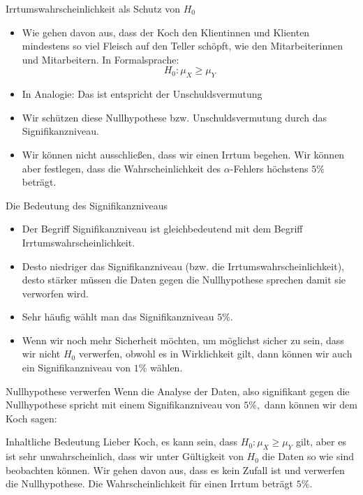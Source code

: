 \documentclass[usenames,dvipsnames,handout]{beamer}
\begin{document}
\begin{frame}{Irrtumswahrscheinlichkeit als Schutz von $H_{0}$}

\begin{itemize}
\item{Wie gehen davon aus, dass der Koch den Klientinnen und Klienten mindestens so viel Fleisch auf den Teller
schöpft, wie den Mitarbeiterinnen und Mitarbeitern. In Formalsprache: $$H_{0}: \mu_{X} \geq \mu_{Y}$$ }\pause
\item{In Analogie: Das ist entspricht der Unschuldsvermutung}\pause
\item{Wir schützen diese Nullhypothese bzw. Unschuldsvermutung durch das Signifikanzniveau.}\pause
\item{Wir können nicht ausschließen, dass wir einen Irrtum begehen. Wir können aber festlegen,
dass die Wahrscheinlichkeit des $\alpha$-Fehlers höchstens $5\%$ beträgt.}\pause
\end{itemize}
\end{frame}

\begin{frame}{Die Bedeutung des Signifikanzniveaus}
\begin{itemize}
\item{Der Begriff Signifikanzniveau ist gleichbedeutend mit dem Begriff Irrtumswahrscheinlichkeit.}\pause
\item{Desto niedriger das Signifikanzniveau (bzw. die Irrtumswahrscheinlichkeit), desto stärker müssen 
die Daten gegen die Nullhypothese sprechen damit sie verworfen wird.}\pause
\item{Sehr häufig wählt man das Signifikanzniveau $5\%.$}\pause
\item{Wenn wir noch mehr Sicherheit möchten, um möglichst sicher zu sein, dass wir nicht 
$H_{0}$ verwerfen, obwohl es in Wirklichkeit gilt, dann können wir auch ein Signifikanzniveau von $1\%$ wählen.}
\end{itemize}
\end{frame}

\begin{frame}{Nullhypothese verwerfen}
Wenn die Analyse der Daten, also signifikant gegen die Nullhypothese spricht mit einem Signifikanzniveau von 
$5\%,$ dann können wir dem Koch sagen:
\begin{block}{Inhaltliche Bedeutung}
Lieber Koch, es kann sein, dass $H_{0}: \mu_{X} \geq \mu_{Y}$ gilt, aber es ist sehr unwahrscheinlich, dass wir 
unter Gültigkeit von $H_{0}$ die Daten so wie sind beobachten können. Wir gehen davon aus, dass es kein Zufall ist und verwerfen
die Nullhypothese. Die Wahrscheinlichkeit für einen Irrtum beträgt $5\%.$
\end{block}
\end{frame}
\end{document}

